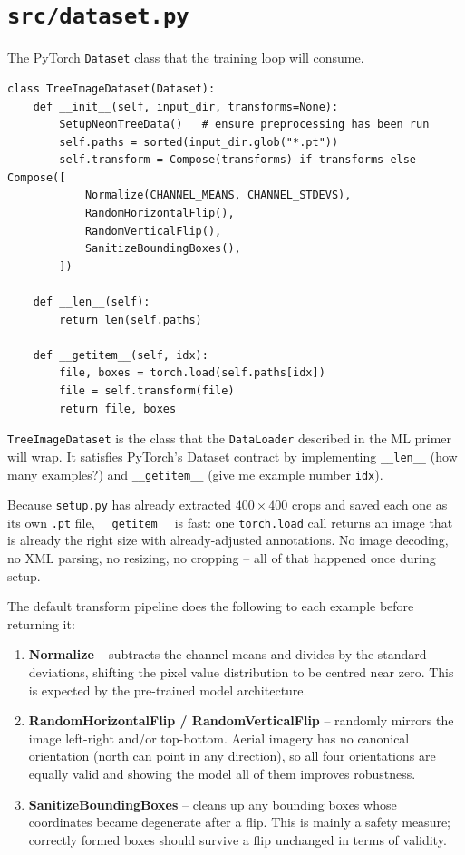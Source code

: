 \documentclass[11pt, a4paper]{article}
\newenvironment{filebox}[1]{%
  \begin{tcolorbox}[
    colback=filebg, colframe=fileframe,
    fonttitle=\bfseries\ttfamily, title=#1,
    breakable, enhanced
  ]
}{%
  \end{tcolorbox}
}
\begin{document}
\section{\texttt{src/dataset.py}}

\begin{filebox}{src/dataset.py}
  The PyTorch \texttt{Dataset} class that the training loop will consume.
\end{filebox}

\begin{lstlisting}
class TreeImageDataset(Dataset):
    def __init__(self, input_dir, transforms=None):
        SetupNeonTreeData()   # ensure preprocessing has been run
        self.paths = sorted(input_dir.glob("*.pt"))
        self.transform = Compose(transforms) if transforms else Compose([
            Normalize(CHANNEL_MEANS, CHANNEL_STDEVS),
            RandomHorizontalFlip(),
            RandomVerticalFlip(),
            SanitizeBoundingBoxes(),
        ])

    def __len__(self):
        return len(self.paths)

    def __getitem__(self, idx):
        file, boxes = torch.load(self.paths[idx])
        file = self.transform(file)
        return file, boxes
\end{lstlisting}

\texttt{TreeImageDataset} is the class that the \texttt{DataLoader} described
in the ML primer will wrap. It satisfies PyTorch's Dataset contract by
implementing \texttt{\_\_len\_\_} (how many examples?) and
\texttt{\_\_getitem\_\_} (give me example number \texttt{idx}).

Because \texttt{setup.py} has already extracted $400 \times 400$ crops and
saved each one as its own \texttt{.pt} file, \texttt{\_\_getitem\_\_} is
fast: one \texttt{torch.load} call returns an image that is already the right
size with already-adjusted annotations. No image decoding, no XML parsing, no
resizing, no cropping -- all of that happened once during setup.

The default transform pipeline does the following to each example before
returning it:

\begin{enumerate}[nosep]
  \item \textbf{Normalize} -- subtracts the channel means and divides by
        the standard deviations, shifting the pixel value distribution to be
        centred near zero. This is expected by the pre-trained model
        architecture.
  \item \textbf{RandomHorizontalFlip / RandomVerticalFlip} -- randomly mirrors
        the image left-right and/or top-bottom. Aerial imagery has no canonical
        orientation (north can point in any direction), so all four orientations
        are equally valid and showing the model all of them improves robustness.
  \item \textbf{SanitizeBoundingBoxes} -- cleans up any bounding boxes whose
        coordinates became degenerate after a flip. This is mainly a safety
        measure; correctly formed boxes should survive a flip unchanged in
        terms of validity.
\end{enumerate}
\end{document}

